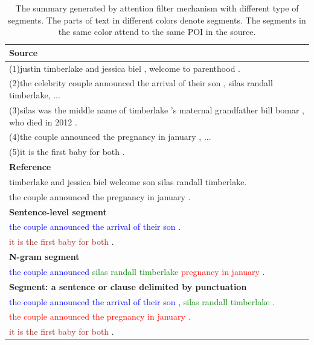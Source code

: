 \documentclass{nle}
\theoremstyle{definition}
\begin{document}
\begin{table}[th!]
	\begin{center}
		\caption{The summary generated by attention filter mechanism with different type of segments. 
			The parts of text in different colors denote segments. The segments in the same color attend to the same POI in the source.}
		\begin{tabular}{|l|}%
			\hline 
			\textbf{Source} \\
			\hline 
			(1)justin timberlake and jessica biel , welcome to parenthood . \\
			(2)the celebrity couple announced the arrival of their son , silas randall timberlake, ... \\
			(3)silas was the middle name of timberlake ’s maternal grandfather bill bomar , who died in 2012 .\\
			(4)the couple announced the pregnancy in january , ... \\
			(5)it is the first baby for both .  \\
			\hline 
			\textbf{Reference} \\
			\hline 
			timberlake and jessica biel welcome son silas randall timberlake. \\
			the couple announced the pregnancy in january . \\
			\hline 
			\textbf{Sentence-level segment} \\
			\hline \textcolor{blue}{the couple announced the arrival of their son .} \\
			\textcolor{brown}{it is the first baby for both} \textcolor{black}{.}  \\
			\hline 
			\textbf{N-gram segment} \\
			\hline \textcolor{blue}{the couple announced} \textcolor{green}{silas randall timberlake} \textcolor{red}{pregnancy in january }  \textcolor{black}{.}\\
			\hline
			\textbf{Segment: a sentence or clause delimited by punctuation} \\
			\hline \textcolor{blue}{the couple announced the arrival of their son ,} \textcolor{green}{silas randall timberlake .} \\
			\textcolor{red}{the couple announced the pregnancy in january .} \\ 
			\textcolor{brown}{it is the first baby for both} \textcolor{black}{.} \\
			\hline 
		\end{tabular}
		\label{tab:punct}
	\end{center}
\end{table}
\end{document}
